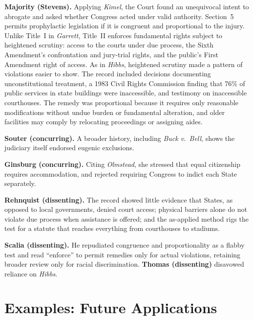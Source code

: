 \documentclass[12pt]{article}
\begin{document}
\textbf{Majority (Stevens).} Applying \textit{Kimel}, the Court found an unequivocal intent to abrogate and asked whether Congress acted under valid authority. Section~5 permits prophylactic legislation if it is congruent and proportional to the injury. Unlike Title~I in \textit{Garrett}, Title~II enforces fundamental rights subject to heightened scrutiny: access to the courts under due process, the Sixth Amendment's confrontation and jury-trial rights, and the public's First Amendment right of access. As in \textit{Hibbs}, heightened scrutiny made a pattern of violations easier to show. The record included decisions documenting unconstitutional treatment, a 1983 Civil Rights Commission finding that 76\% of public services in state buildings were inaccessible, and testimony on inaccessible courthouses. The remedy was proportional because it requires only reasonable modifications without undue burden or fundamental alteration, and older facilities may comply by relocating proceedings or assigning aides.

\textbf{Souter (concurring).} A broader history, including \textit{Buck v.\ Bell}, shows the judiciary itself endorsed eugenic exclusions.

\textbf{Ginsburg (concurring).} Citing \textit{Olmstead}, she stressed that equal citizenship requires accommodation, and rejected requiring Congress to indict each State separately.

\textbf{Rehnquist (dissenting).} The record showed little evidence that States, as opposed to local governments, denied court access; physical barriers alone do not violate due process when assistance is offered; and the as-applied method rigs the test for a statute that reaches everything from courthouses to stadiums.

\textbf{Scalia (dissenting).} He repudiated congruence and proportionality as a flabby test and read ``enforce'' to permit remedies only for actual violations, retaining broader review only for racial discrimination. \textbf{Thomas (dissenting)} disavowed reliance on \textit{Hibbs}.

\section{Examples: Future Applications}
\end{document}
